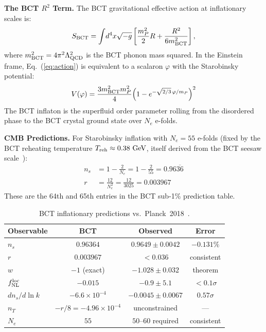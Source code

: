 \documentclass[aps,prl,twocolumn,superscriptaddress,floatfix]{revtex4-2}
\begin{document}
\medskip
\noindent\textbf{The BCT $R^2$ Term.}
The BCT gravitational effective action at inflationary scales is:
\begin{equation}
  S_{\rm BCT} = \int\!d^4x\sqrt{-g}\left[\frac{m_P^2}{2}R
    + \frac{R^2}{6m_{\rm BCT}^2}\right],
  \label{eq:action}
\end{equation}
where $m_{\rm BCT}^2 = 4\pi^2\Lambda_{\rm QCD}^2$ is the BCT phonon mass
squared. In the Einstein frame, Eq.~(\ref{eq:action}) is equivalent to
a scalaron $\varphi$ with the Starobinsky potential:
\begin{equation}
  V(\varphi) = \frac{3m_{\rm BCT}^2 m_P^2}{4}
    \!\left(1 - e^{-\sqrt{2/3}\,\varphi/m_P}\right)^2
  \label{eq:Vphi}
\end{equation}
The BCT inflaton is the superfluid order parameter rolling from the
disordered phase to the BCT crystal ground state over $N_e$ e-folds.

\medskip
\noindent\textbf{CMB Predictions.}
For Starobinsky inflation with $N_e = 55$ e-folds (fixed by the BCT
reheating temperature $T_{\rm reh} \approx 0.38\ \mathrm{GeV}$,
itself derived from the BCT seesaw scale~\cite{Monograph}):
\begin{align}
  n_s &= 1 - \frac{2}{N_e} = 1 - \frac{2}{55} = 0.96\overline{36} \label{eq:ns} \\
  r   &= \frac{12}{N_e^2} = \frac{12}{3025} = 0.003967 \label{eq:r}
\end{align}
These are the 64th and 65th entries in the BCT sub-1\% prediction table.

\begin{table}[h]
\centering
\caption{BCT inflationary predictions vs.\ Planck~2018~\cite{Planck2018}.}
\label{tab:CMB}
\begin{tabular}{lccc}
\toprule
Observable & BCT & Observed & Error \\
\midrule
$n_s$ & $0.96364$ & $0.9649\pm0.0042$ & $-0.131\%$ \\
$r$ & $0.003967$ & ${<}0.036$ & consistent \\
$w$ & $-1$ (exact) & $-1.028\pm0.032$ & theorem \\
$f_{\rm NL}^{\rm loc}$ & $-0.015$ & $-0.9\pm5.1$ & ${<}0.1\sigma$ \\
$dn_s/d\ln k$ & $-6.6\times10^{-4}$ & $-0.0045\pm0.0067$ & $0.57\sigma$ \\
$n_T$ & $-r/8 = -4.96\times10^{-4}$ & unconstrained & — \\
$N_e$ & $55$ & $50$--$60$ required & consistent \\
\bottomrule
\end{tabular}
\end{table}
\end{document}
